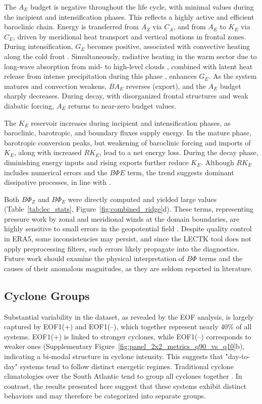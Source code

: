 \documentclass[pdflatex,sn-chicago]{sn-jnl}%
\theoremstyle{plain}
\theoremstyle{definition}
\theoremstyle{remark}
\theoremstyle{definition}
\begin{document}
The $A_E$ budget is negative throughout the life cycle, with minimal values during the incipient and intensification phases. This reflects a highly active and efficient baroclinic chain. Energy is transferred from $A_Z$ via $C_A$, and from $A_E$ to $K_E$ via $C_E$, driven by meridional heat transport and vertical motions in frontal zones. During intensification, $G_E$ becomes positive, associated with convective heating along the cold front \citep[e.g.,][]{govekar2011three}. Simultaneously, radiative heating in the warm sector due to long-wave absorption from mid- to high-level clouds \citep{lau1997comparing,keshtgar2023cloud}, combined with latent heat release from intense precipitation during this phase \citep{mcerlich2023assessment}, enhances $G_E$. As the system matures and convection weakens, $BA_E$ reverses (export), and the $A_E$ budget sharply decreases. During decay, with disorganized frontal structures and weak diabatic forcing, $A_E$ returns to near-zero budget values.

The $K_E$ reservoir increases during incipient and intensification phases, as baroclinic, barotropic, and boundary fluxes supply energy. In the mature phase, barotropic conversion peaks, but weakening of baroclinic forcing and imports of $K_E$, along with increased $RK_E$, lead to a net energy loss. During the decay phase, diminishing energy inputs and rising exports further reduce $K_E$. Although $RK_E$ includes numerical errors and the $B\Phi E$ term, the trend suggests dominant dissipative processes, in line with \citet{smith1980energetics}.

Both $B\Phi_Z$ and $B\Phi_E$ were directly computed and yielded large values (Table~\ref{tab:lec_stats}, Figure~\ref{fig:combined_ridge}d). These terms, representing pressure work by zonal and meridional winds at the domain boundaries, are highly sensitive to small errors in the geopotential field \citep{brennan1980zonal}. Despite quality control in ERA5, some inconsistencies may persist, and since the LECTK tool does not apply preprocessing filters, such errors likely propagate into the diagnostics. Future work should examine the physical interpretation of $B\Phi$ terms and the causes of their anomalous magnitudes, as they are seldom reported in literature.


\subsection{Cyclone Groups}

Substantial variability in the dataset, as revealed by the EOF analysis, is largely captured by EOF1(+) and EOF1(–), which together represent nearly 40\% of all systems. EOF1(+) is linked to stronger cyclones, while EOF1(–) corresponds to weaker ones (Supplementary Figure~\ref{fig:panel_2x2_metrics_q90_vs_q10}b), indicating a bi-modal structure in cyclone intensity. This suggests that "day-to-day" systems tend to follow distinct energetic regimes. Traditional cyclone climatologies over the South Atlantic tend to group all cyclones together \citep[e.g.,]{sinclair1994objective,hoskins2005new,reboita2010south,gramcianinov2019properties}. In contrast, the results presented here suggest that these systems exhibit distinct behaviors and may therefore be categorized into separate groups.
\end{document}
